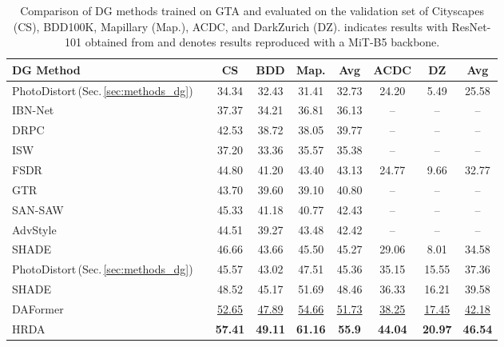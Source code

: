 \documentclass[journal,compsoc]{IEEEtran}
\begin{document}
\begin{table}
\centering
\caption{
Comparison of DG methods trained on GTA and evaluated on the validation set of Cityscapes (CS), BDD100K, Mapillary (Map.), ACDC, and DarkZurich (DZ).  indicates results with ResNet-101 obtained from \cite{zhao2022style} and  denotes results reproduced with a MiT-B5 backbone.
}
\label{tab:sota_dg}
\setlength{\tabcolsep}{1.5pt}
\footnotesize
\begin{tabular}{l|c|cccc|ccc}
\toprule
DG Method & & CS & BDD & Map. & Avg & ACDC & DZ & Avg\\
\midrule
PhotoDistort\,(Sec.\,\ref{sec:methods_dg}) & \parbox[t]{2mm}{} & 34.34 & 32.43 & 31.41 & 32.73 & 24.20 & 5.49 & 25.58\\
IBN-Net~\cite{pan2018two} &  & 37.37 & 34.21 & 36.81 & 36.13 & -- & -- & --\\
DRPC~\cite{yue2019domain} &  & 42.53 & 38.72 & 38.05 & 39.77 & -- & -- & --\\
ISW~\cite{choi2021robustnet} &  & 37.20 & 33.36 & 35.57 & 35.38 & -- & -- & --\\
FSDR~\cite{huang2021fsdr} &  & 44.80 & 41.20 & 43.40 & 43.13 & 24.77 & 9.66 & 32.77\\
GTR~\cite{peng2021global} &  & 43.70 & 39.60 & 39.10 & 40.80 & -- & -- & --\\
SAN-SAW~\cite{peng2022semantic} &  & 45.33 & 41.18 & 40.77 & 42.43 & -- & -- & --\\
AdvStyle~\cite{zhongadversarial} &  & 44.51 & 39.27 & 43.48 & 42.42 & -- & -- & --\\
SHADE~\cite{zhao2022style} &  & 46.66 & 43.66 & 45.50 & 45.27 & 29.06 & 8.01 & 34.58\\
\midrule
PhotoDistort\,(Sec.\,\ref{sec:methods_dg}) & \parbox[t]{2mm}{} & 45.57 & 43.02 & 47.51 & 45.36 & 35.15 & 15.55 & 37.36\\
SHADE~\cite{zhao2022style} &  & 48.52 & 45.17 & 51.69 & 48.46 & 36.33 & 16.21 & 39.58\\
DAFormer &  & \underline{52.65} & \underline{47.89} & \underline{54.66} & \underline{51.73} & \underline{38.25} & \underline{17.45} & \underline{42.18}\\
HRDA &  & \textbf{57.41} & \textbf{49.11} & \textbf{61.16} & \textbf{55.9} & \textbf{44.04} & \textbf{20.97} & \textbf{46.54}\\

\bottomrule
\end{tabular}
\end{table}
 
\end{document}
